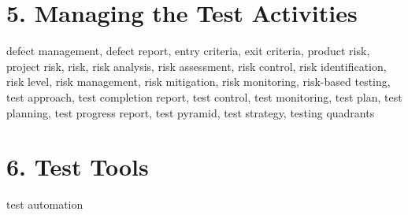 \documentclass{article}
\begin{document}
\begin{multicols}{3}
{\section*{5. Managing the Test Activities}
defect management, defect report, entry criteria, exit criteria, product risk, project risk, risk, risk analysis, risk assessment, risk control, risk identification, risk level, risk management, risk mitigation, risk monitoring, risk-based testing, test approach, test completion report, test control, test monitoring, test plan, test planning, test progress report, test pyramid, test strategy, testing quadrants\\

\section*{6. Test Tools}
test automation
}





\end{multicols}
\end{document}
